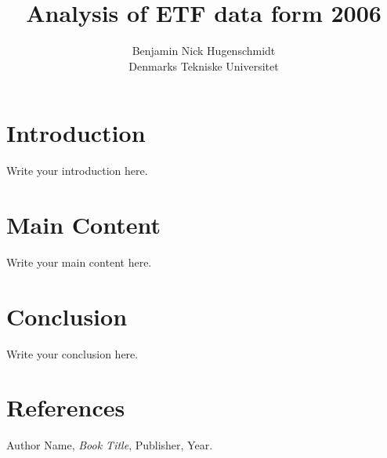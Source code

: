 \documentclass{article}
\begin{document}
\title{\textbf{Analysis of ETF data form 2006}}
\author{Benjamin Nick Hugenschmidt \\ Denmarks Tekniske Universitet}
\maketitle

\tableofcontents
\newpage

\section{Introduction}
Write your introduction here.

\section{Main Content}
Write your main content here.

\section{Conclusion}
Write your conclusion here.

\section{References}
\begin{thebibliography}{9}
     Author Name, \textit{Book Title}, Publisher, Year.
\end{thebibliography}
\end{document}
